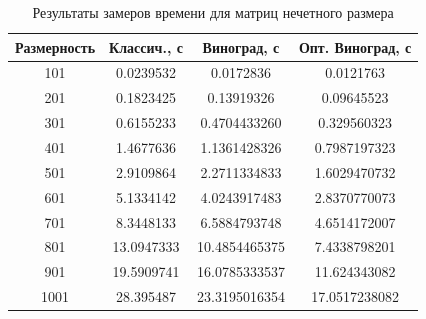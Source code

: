 \documentclass[a4paper,14pt]{report}
\begin{document}

\begin{table}
	\caption{Результаты замеров времени для матриц нечетного размера}
		\begin{tabular}{|c | c | c | c |}
	 	\hline
		Размерность & Классич., с & Виноград, с & Опт. Виноград, с \\ [0.5ex]
	 	\hline\hline
		101 & 0.0239532 & 0.0172836 & 0.0121763 \\ \hline
		201 & 0.1823425 & 0.13919326 & 0.09645523 \\ \hline
		301 & 0.6155233 & 0.4704433260 & 0.329560323 \\ \hline
		401 & 1.4677636 & 1.1361428326 & 0.7987197323 \\ \hline
		501 & 2.9109864 & 2.2711334833 & 1.6029470732 \\ \hline
		601 & 5.1334142 & 4.0243917483 & 2.8370770073 \\ \hline
		701 & 8.3448133 & 6.5884793748 & 4.6514172007 \\ \hline
		801 & 13.0947333 & 10.4854465375 & 7.4338798201 \\ \hline
		901 & 19.5909741 & 16.0785333537 & 11.624343082 \\ \hline
		1001 & 28.395487 & 23.3195016354 & 17.0517238082 \\ \hline
		\end{tabular}
\end{table}
\end{document}
